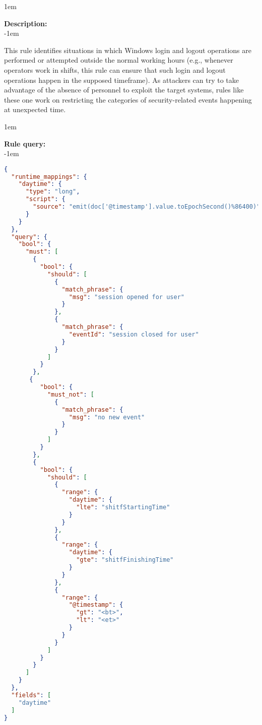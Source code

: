 \openup 1em

{\bf Description:} \\

\openup -1em
\vspace{-2em}


This rule identifies situations in which Windows login and logout operations are performed or attempted outside the normal working hours (e.g., whenever operators work in shifts, this rule can ensure that such login and logout operations happen in the supposed timeframe). As attackers can try to take advantage of the absence of personnel to exploit the target systems, rules like these one work on restricting the categories of security-related events happening at unexpected time.

\openup 1em

{\bf Rule query:} \\

\openup -1em
\vspace{-2em}

\begin{lstlisting}[language=json,firstnumber=1]
{
  "runtime_mappings": {
    "daytime": {
      "type": "long",
      "script": {
        "source": "emit(doc['@timestamp'].value.toEpochSecond()%86400)"
      }
    }
  },
  "query": {
    "bool": {
      "must": [
        {
          "bool": {
            "should": [
              {
                "match_phrase": {
                  "msg": "session opened for user"
                }
              },
              {
                "match_phrase": {
                  "eventId": "session closed for user"
                }
              }
            ]
          }
        },
       {
          "bool": {
            "must_not": [
              {
                "match_phrase": {
                  "msg": "no new event"
                }
              }
            ]
          }
        },
        {
          "bool": {
            "should": [
              {
                "range": {
                  "daytime": {
                    "lte": "shitfStartingTime"
                  }
                }
              },
              {
                "range": {
                  "daytime": {
                    "gte": "shitfFinishingTime"
                  }
                }
              },
              {
                "range": {
                  "@timestamp": {
                    "gt": "<bt>",
                    "lt": "<et>"
                  }
                }
              }
            ]
          }
        }
      ]
    }
  },
  "fields": [
    "daytime"
  ]
}
\end{lstlisting}

